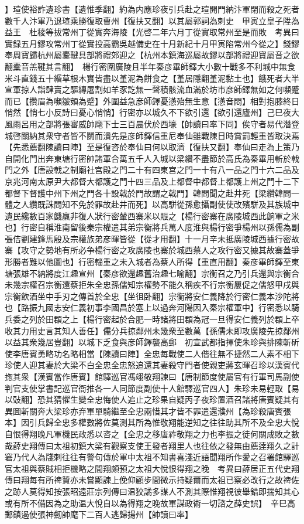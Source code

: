 】瑄使裕詐遺珍書【遺惟季翻】約為内應珍夜引兵赴之瑄開門納汴軍閉而殺之死者數千人汴軍乃退瑄乘勝復取曹州【復扶又翻】以其屬郭詞為刺史　甲寅立皇子陞為益王　杜稜等拔常州丁從實奔海陵【光啓二年六月丁從實取常州至是而敗　考異曰實録五月鏐攻常州丁從實投高霸吳越備史在十月新紀十月甲寅陷常州今從之】錢鏐奉周寶歸杭州屬櫜鞬具部將禮郊迎之【杭州本鎮海巡屬故鏐以部將禮迎寶屬音之欲翻櫜音羔鞬其言翻】　楊行密圍廣陵且半年秦彦畢師鐸大小數十戰多不利城中無食米斗直錢五十緡草根木實皆盡以堇泥為餅食之【堇居隱翻堇泥黏土也】餓死者大半宣軍掠人詣肆賣之驅縳屠割如羊豕訖無一聲積骸流血滿於坊市彦師鐸無如之何嚬蹙而已【攢眉為嚬皺頞為蹙】外圍益急彦師鐸憂懣殆無生意【懣音悶】相對抱膝終日悄然【悄七小反詩曰憂心悄悄】行密亦以城久不下欲引還【欲引還廬州】己巳夜大風雨呂用之部將張審威帥麾下士三百晨伏於西壕【帥讀曰率下同】俟守者易代潛登城啓關納其衆守者皆不鬬而潰先是彦師鐸信重尼奉仙雖戰陳日時賞罰輕重皆取決焉【先悉薦翻陳讀曰陣】至是復咨於奉仙曰何以取濟【復扶又翻】奉仙曰走為上策乃自開化門出奔東塘行密帥諸軍合萬五千人入城以梁纘不盡節於高氏為秦畢用斬於戟門之外【唐設戟之制廟社宫殿之門二十有四東宫之門一十有八一品之門十六二品及京兆河南太原尹大都督大都護之門十四三品及上都督中都督上都護上州之門十二下都督下督護中州下州之門各十設戟於門故謂之戟門】韓問聞之赴井死【梁纘韓問一體之人纘既誅問知不免於罪故赴井而死】以高駢從孫愈攝副使使改殯駢及其族城中遺民纔數百家饑羸非復人狀行密輦西寨米以賑之【楊行密寨在廣陵城西此餉軍之米也】行密自稱淮南留後秦宗權遣其弟宗衡將兵萬人度淮與楊行密爭楊州以孫儒為副張佶劉建鋒馬殷及宗權族弟彦暉皆從【從才用翻】十一月辛未抵廣陵城西據行密故寨【攻守之勢地有所必争楊行密之攻廣陵也寨於城西蔡人之攻行密又據其故寨蓋爭形勝者難以他圖也】行密輜重之未入城者為蔡人所得【重直用翻】秦彦畢師鐸至東塘張雄不納將度江趣宣州【秦彦欲還趣舊治趣七喻翻】宗衡召之乃引兵還與宗衡合未幾宗權召宗衡還蔡拒朱全忠孫儒知宗權勢不能久稱疾不行宗衡屢促之儒怒甲戌與宗衡飲酒坐中手刃之傳首於全忠【坐徂卧翻】宗衡將安仁義降於行密仁義本沙陀將也【路振九國志安仁義初事李國昌於塞上以過奔河陽因入秦宗權軍中】行密悉以騎兵委之列於田頵之上【楊行密起於合肥一時諸將田頵為冠一旦得安仁義列於頵上卒收其力用史言其知人善任】儒分兵掠鄰州未幾衆至數萬【孫儒未即攻廣陵先掠鄰州以益其衆幾居豈翻】以城下乏食與彦師鐸襲高郵　初宣武都指揮使朱珍與排陳斬斫使李唐賓勇略功名略相當【陳讀曰陣】全忠每戰使二人偕往無不捷然二人素不相下珍使人迎其妻於大梁不白全忠全忠怒追還其妻殺守門者使親吏蔣玄暉召珍以漢賓代揔其衆【漢賓當作唐賓】館驛巡官馮翊敬翔諫曰【唐制節度使屬官有行軍司馬副使判官支使掌書記巡官衙推各一人同節度副使十人館驛巡官四人】朱珍未易輕取【易以䜴翻】恐其猜懼生變全忠悔使人追止之珍果自疑丙子夜珍置酒召諸將唐賓疑其有異圖斬關奔大梁珍亦弃軍單騎繼至全忠兩惜其才皆不罪遣還濮州【為珍殺唐賓張本】因引兵歸全忠多權數將佐莫測其所為惟敬翔能逆知之往往助其所不及全忠大悅自恨得翔晚凡軍機民政悉以咨之【全忠之移唐祚敬翔之力也李振之徒何關成敗之數哉薛史翔傳曰太祖初鎮大梁有觀察支使王發者翔里人也往依之發無由薦逹翔久之計窘乃代人為牋刺往往有警句傳於軍中太祖不知書喜淺近語聞翔所作愛之召署館驛巡官太祖與蔡賊相拒機略之間翔頗預之太祖大悅恨得翔之晚　考異曰薛居正五代史翔傳曰翔每有所禆贊亦未嘗顯諫上俛仰顧步間微示持疑爾而太祖已察必改行之故禆佐之跡人莫得知按張昭遠莊宗列傳曰温狡譎多謀人不測其際惟翔視彼舉錯即揣知其心或有所不備因為之助温大悅自以為得翔之晚故軍謀政術一切諮之薛史誤】　辛巳高郵鎮遏使張神劒帥麾下二百人逃歸揚州【帥讀曰率】
